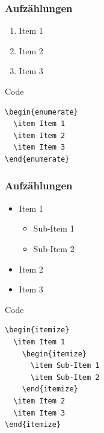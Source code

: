 \begin{frame}[fragile]
  \frametitle{Aufzählungen}

  \begin{example}
    \begin{enumerate}
      \item Item 1
      \item Item 2
      \item Item 3
    \end{enumerate}
  \end{example}

  \begin{block}{Code}
    \begin{verbatim}
\begin{enumerate}
  \item Item 1
  \item Item 2
  \item Item 3
\end{enumerate}
    \end{verbatim}
  \end{block}
\end{frame}
\begin{frame}[fragile]
  \frametitle{Aufzählungen}

  \begin{example}
    \begin{itemize}
      \item Item 1
        \begin{itemize}
          \item Sub-Item 1
          \item Sub-Item 2
        \end{itemize}
      \item Item 2
      \item Item 3
    \end{itemize}
  \end{example}
  \pause
  \begin{block}{Code}
    \begin{verbatim}
\begin{itemize}
  \item Item 1
    \begin{itemize}
      \item Sub-Item 1
      \item Sub-Item 2
    \end{itemize}
  \item Item 2
  \item Item 3
\end{itemize}
    \end{verbatim}
  \end{block}
\end{frame}






